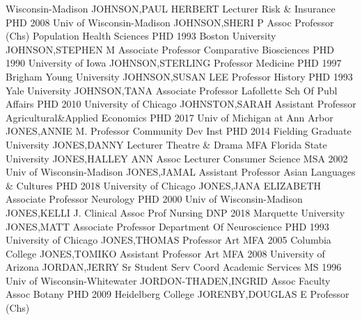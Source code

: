 \documentclass[
]{article}
\begin{document}
Wisconsin-Madison \textbar JOHNSON,PAUL HERBERT \textbar Lecturer
\textbar{}  \textbar Risk \& Insurance \textbar PHD 2008
Univ of Wisconsin-Madison \textbar JOHNSON,SHERI P \textbar Assoc
Professor (Chs) \textbar{}  \textbar Population Health
Sciences \textbar PHD 1993 Boston University \textbar JOHNSON,STEPHEN M
\textbar Associate Professor \textbar{} 
\textbar Comparative Biosciences \textbar PHD 1990 University of Iowa
\textbar JOHNSON,STERLING \textbar Professor \textbar{} 
\textbar Medicine \textbar PHD 1997 Brigham Young University
\textbar JOHNSON,SUSAN LEE \textbar Professor \textbar{} 
\textbar History \textbar PHD 1993 Yale University \textbar JOHNSON,TANA
\textbar Associate Professor \textbar{}  \textbar Lafollette
Sch Of Publ Affairs \textbar PHD 2010 University of Chicago
\textbar JOHNSTON,SARAH \textbar Assistant Professor \textbar{}
 \textbar Agricultural\&Applied Economics \textbar PHD 2017
Univ of Michigan at Ann Arbor \textbar JONES,ANNIE M. \textbar Professor
\textbar{}  \textbar Community Dev Inst \textbar PHD 2014
Fielding Graduate University \textbar JONES,DANNY \textbar Lecturer
\textbar{}  \textbar Theatre \& Drama \textbar MFA Florida
State University \textbar JONES,HALLEY ANN \textbar Assoc Lecturer
\textbar{}  \textbar Consumer Science \textbar MSA 2002 Univ
of Wisconsin-Madison \textbar JONES,JAMAL \textbar Assistant Professor
\textbar{}  \textbar Asian Languages \& Cultures
\textbar PHD 2018 University of Chicago \textbar JONES,JANA ELIZABETH
\textbar Associate Professor \textbar{}  \textbar Neurology
\textbar PHD 2000 Univ of Wisconsin-Madison \textbar JONES,KELLI J.
\textbar Clinical Assoc Prof \textbar{}  \textbar Nursing
\textbar DNP 2018 Marquette University \textbar JONES,MATT
\textbar Associate Professor \textbar{}  \textbar Department
Of Neuroscience \textbar PHD 1993 University of Chicago
\textbar JONES,THOMAS \textbar Professor \textbar{} 
\textbar Art \textbar MFA 2005 Columbia College \textbar JONES,TOMIKO
\textbar Assistant Professor \textbar{}  \textbar Art
\textbar MFA 2008 University of Arizona \textbar JORDAN,JERRY
\textbar Sr Student Serv Coord \textbar{}  \textbar Academic
Services \textbar MS 1996 Univ of Wisconsin-Whitewater
\textbar JORDON-THADEN,INGRID \textbar Assoc Faculty Assoc \textbar{}
 \textbar Botany \textbar PHD 2009 Heidelberg College
\textbar JORENBY,DOUGLAS E \textbar Professor (Chs) \textbar{}
\end{document}

